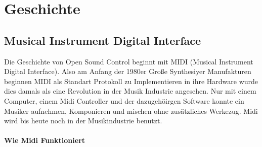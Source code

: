 \documentclass[a4paper, 12pt]{article}
\begin{document}
\maketitle

\newpage
\tableofcontents
\newpage


\section{Geschichte}
\subsection{Musical Instrument Digital Interface}
Die Geschichte von Open Sound Control beginnt mit MIDI (Musical Instrument Digital Interface).
Also am Anfang der 1980er Große Synthesiyer Manufakturen beginnen MIDI als Standart Protokoll zu Implementieren in ihre Hardware wurde dies damals als eine Revolution in der Musik Industrie angesehen. Nur mit einem Computer, einem Midi Controller und der dazugehöirgen Software konnte ein Musiker aufnehmen, Komponieren und mischen ohne zusätzliches Werkezug. Midi wird bis heute noch in der Musikindustrie benutzt. 
\paragraph{Wie Midi Funktioniert}
\end{document}
